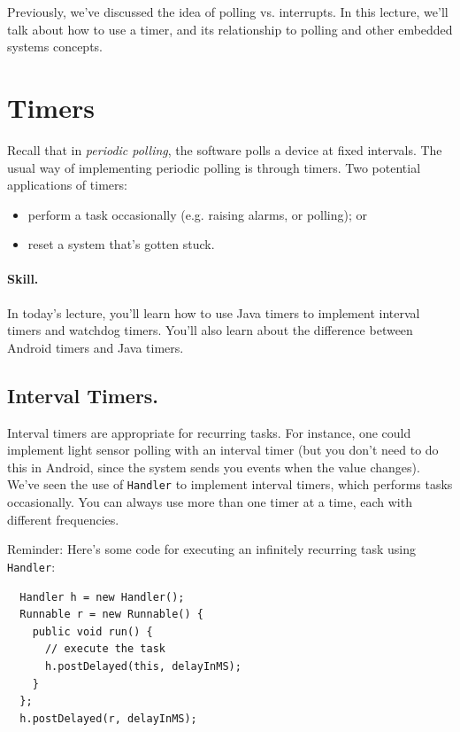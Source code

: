 




Previously, we've discussed the idea of polling vs. interrupts. In this lecture, we'll talk about how to use a timer, and its relationship to polling and other embedded
systems concepts.

\section*{Timers}
Recall that in \emph{periodic polling}, the software polls a device at
fixed intervals. The usual way of implementing periodic polling is
through timers. Two potential applications of timers:
\begin{itemize}
\item perform a task occasionally (e.g. raising alarms, or polling); or
\item reset a system that's gotten stuck.
\end{itemize}




\paragraph{Skill.} In today's lecture, you'll learn how to use Java timers to
implement interval timers and watchdog timers. You'll also learn about
the difference between Android timers and Java timers.

\subsection*{Interval Timers.} Interval timers are appropriate for recurring tasks. 
For instance, one could implement light sensor polling with an
interval timer (but you don't need to do this in Android, since the
system sends you events when the value changes). We've seen the use of
{\tt Handler} to implement interval timers, which performs tasks
occasionally.  You can always use more than one timer at a time, each
with different frequencies.

Reminder: Here's some code for executing an infinitely recurring task using
{\tt Handler}:

{\small \begin{verbatim}
  Handler h = new Handler();
  Runnable r = new Runnable() {
    public void run() {
      // execute the task
      h.postDelayed(this, delayInMS);
    }
  };
  h.postDelayed(r, delayInMS);
\end{verbatim}}

